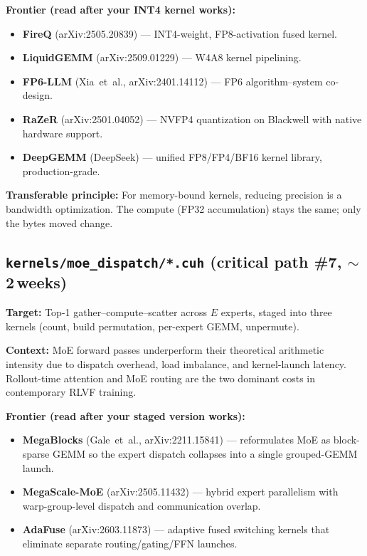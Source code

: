 \documentclass[11pt, letterpaper]{article}
\begin{document}
\textbf{Frontier (read after your INT4 kernel works):}
\begin{itemize}
\item \textbf{FireQ} (arXiv:2505.20839) --- INT4-weight, FP8-activation fused kernel.
\item \textbf{LiquidGEMM} (arXiv:2509.01229) --- W4A8 kernel pipelining.
\item \textbf{FP6-LLM} (Xia~et~al., arXiv:2401.14112) --- FP6 algorithm--system co-design.
\item \textbf{RaZeR} (arXiv:2501.04052) --- NVFP4 quantization on Blackwell with native hardware support.
\item \textbf{DeepGEMM} (DeepSeek) --- unified FP8/FP4/BF16 kernel library, production-grade.
\end{itemize}

\textbf{Transferable principle:} For memory-bound kernels, reducing precision is a bandwidth optimization. The compute (FP32 accumulation) stays the same; only the bytes moved change.

\subsection{\texttt{kernels/moe\_dispatch/*.cuh} (critical path \#7, $\sim$2\,weeks)}

\textbf{Target:} Top-1 gather--compute--scatter across $E$ experts, staged into three kernels (count, build permutation, per-expert GEMM, unpermute).

\textbf{Context:} MoE forward passes underperform their theoretical arithmetic intensity due to dispatch overhead, load imbalance, and kernel-launch latency. Rollout-time attention and MoE routing are the two dominant costs in contemporary RLVF training.

\textbf{Frontier (read after your staged version works):}
\begin{itemize}
\item \textbf{MegaBlocks} (Gale~et~al., arXiv:2211.15841) --- reformulates MoE as block-sparse GEMM so the expert dispatch collapses into a single grouped-GEMM launch.
\item \textbf{MegaScale-MoE} (arXiv:2505.11432) --- hybrid expert parallelism with warp-group-level dispatch and communication overlap.
\item \textbf{AdaFuse} (arXiv:2603.11873) --- adaptive fused switching kernels that eliminate separate routing/gating/FFN launches.
\end{itemize}
\end{document}

